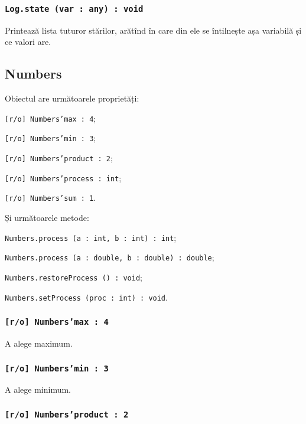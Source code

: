 \subsubsection{\texttt{Log.state (var : any) : void}}

Printează lista tuturor stărilor, arătînd în care din ele se întilnește așa variabilă și ce valori are.

\subsection{Numbers}

Obiectul \numbers{} are următoarele proprietăți:
\begin{icItems}
	\item \texttt{[r/o] Numbers'max : 4};
	\item \texttt{[r/o] Numbers'min : 3};
	\item \texttt{[r/o] Numbers'product : 2};
	\item \texttt{[r/o] Numbers'process : int};
	\item \texttt{[r/o] Numbers'sum : 1}.
\end{icItems}

Și următoarele metode:
\begin{icItems}
	\item \texttt{Numbers.process (a : int, b : int) : int};
	\item \texttt{Numbers.process (a : double, b : double) : double};
	\item \texttt{Numbers.restoreProcess () : void};
	\item \texttt{Numbers.setProcess (proc : int) : void}.
\end{icItems}

\subsubsection{\texttt{[r/o] Numbers'max : 4}}

A alege maximum.

\subsubsection{\texttt{[r/o] Numbers'min : 3}}

A alege minimum.

\subsubsection{\texttt{[r/o] Numbers'product : 2}}

